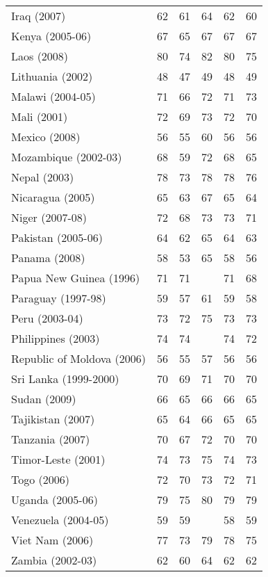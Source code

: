 \begin{tabular}{L{2.0cm} R{0.7cm} R{0.7cm} R{0.7cm} R{0.7cm} R{0.7cm}}
        Iraq (2007) & 62 & 61 & 64 & 62 & 60 \\
        Kenya (2005-06) & 67 & 65 & 67 & 67 & 67 \\
        Laos (2008) & 80 & 74 & 82 & 80 & 75 \\
        Lithuania (2002) & 48 & 47 & 49 & 48 & 49 \\
        Malawi (2004-05) & 71 & 66 & 72 & 71 & 73 \\
        Mali (2001) & 72 & 69 & 73 & 72 & 70 \\
        Mexico (2008) & 56 & 55 & 60 & 56 & 56 \\
        Mozambique (2002-03) & 68 & 59 & 72 & 68 & 65 \\
        Nepal (2003) & 78 & 73 & 78 & 78 & 76 \\
        Nicaragua (2005) & 65 & 63 & 67 & 65 & 64 \\
        Niger (2007-08) & 72 & 68 & 73 & 73 & 71 \\
        Pakistan (2005-06) & 64 & 62 & 65 & 64 & 63 \\
        Panama (2008) & 58 & 53 & 65 & 58 & 56 \\
        Papua New Guinea (1996) & 71 & 71 &  & 71 & 68 \\
        Paraguay (1997-98) & 59 & 57 & 61 & 59 & 58 \\
        Peru (2003-04) & 73 & 72 & 75 & 73 & 73 \\
        Philippines (2003) & 74 & 74 &  & 74 & 72 \\
        Republic of Moldova (2006) & 56 & 55 & 57 & 56 & 56 \\
        Sri Lanka (1999-2000) & 70 & 69 & 71 & 70 & 70 \\
        Sudan (2009) & 66 & 65 & 66 & 66 & 65 \\
        Tajikistan (2007) & 65 & 64 & 66 & 65 & 65 \\
        Tanzania (2007) & 70 & 67 & 72 & 70 & 70 \\
        Timor-Leste (2001) & 74 & 73 & 75 & 74 & 73 \\
        Togo (2006) & 72 & 70 & 73 & 72 & 71 \\
        Uganda (2005-06) & 79 & 75 & 80 & 79 & 79 \\
        Venezuela (2004-05) & 59 & 59 &  & 58 & 59 \\
        Viet Nam (2006) & 77 & 73 & 79 & 78 & 75 \\
        Zambia (2002-03) & 62 & 60 & 64 & 62 & 62 \\
       \toprule
      \end{tabular}
\clearpage

